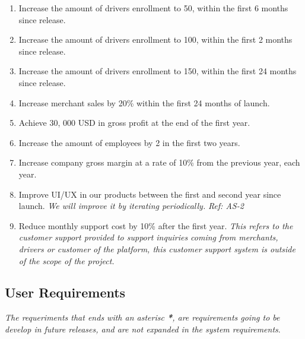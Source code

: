 \begin{enumerate}[label=BR-\arabic*]
    \item Increase the amount of drivers enrollment to 50, within the first 
    6 months since release.
    \item Increase the amount of drivers enrollment to 100, within the first 
    2 months since release.
    \pagebreak
    \item Increase the amount of drivers enrollment to 150, within the first 
    24 months since release.
    \item Increase merchant sales by 20\% within the first 24 months of launch.
    \item Achieve 30, 000 USD in gross profit at the end of the first year.
    \item Increase the amount of employees by 2 in the first two years.
    \item Increase company gross margin at a rate of 10\% from the previous 
    year, each year.
    \item Improve UI/UX in our products between the first and second year 
    since launch. \textit{We will improve it by iterating periodically.}
    \newline \textit{Ref: AS-2}
    \item Reduce monthly support cost by 10\% after the first year. 
    \textit{This refers to the customer support provided to support inquiries 
    coming from merchants, drivers or customer of the platform, this customer 
    support system is outside of the scope of the project.} 
\end{enumerate}
\pagebreak 
\subsection{User Requirements}
\textit{The requeriments that ends with an asterisc \textbf{*}, are 
requirements going to be develop in future releases, and are not expanded in 
the system requirements}.
